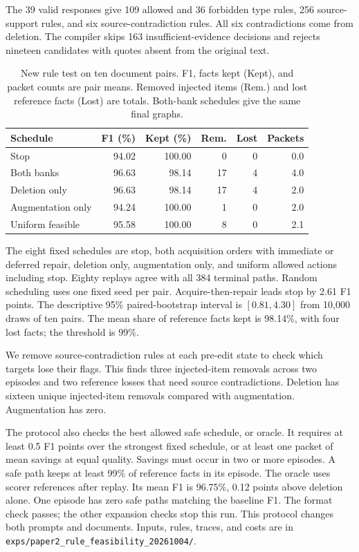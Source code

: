 The 39 valid responses give 109 allowed and 36 forbidden type rules,
256 source-support rules, and six source-contradiction rules.
All six contradictions come from deletion. The compiler skips 163
insufficient-evidence decisions and rejects nineteen candidates with
quotes absent from the original text.

\begin{table}[t]
\centering
\caption{New rule test on ten document pairs. F1, facts kept (Kept), and packet counts are pair means. Removed injected items (Rem.) and lost reference facts (Lost) are totals. Both-bank schedules give the same final graphs.}
\label{tab:new_rule_feasibility}
\small
\setlength{\tabcolsep}{3pt}
\begin{tabular}{lrrrrr}
\toprule
Schedule & F1 (\%) & Kept (\%) & Rem. & Lost & Packets \\
\midrule
Stop & 94.02 & 100.00 & 0 & 0 & 0.0 \\
Both banks & 96.63 & 98.14 & 17 & 4 & 4.0 \\
Deletion only & 96.63 & 98.14 & 17 & 4 & 2.0 \\
Augmentation only & 94.24 & 100.00 & 1 & 0 & 2.0 \\
Uniform feasible & 95.58 & 100.00 & 8 & 0 & 2.1 \\
\bottomrule
\end{tabular}
\end{table}

The eight fixed schedules are stop, both acquisition orders with immediate
or deferred repair, deletion only, augmentation only, and uniform allowed
actions including stop. Eighty replays agree with all 384 terminal paths.
Random scheduling uses one fixed seed per pair.
Acquire-then-repair leads stop by 2.61 F1 points. The descriptive 95\%
paired-bootstrap interval is $[0.81,4.30]$ from 10,000 draws of ten pairs.
The mean share of reference facts kept is 98.14\%, with four lost facts; the threshold is 99\%.

We remove source-contradiction rules at each pre-edit state to check which
targets lose their flags. This finds three injected-item removals across
two episodes and two reference losses that need source contradictions.
Deletion has sixteen unique injected-item removals compared with
augmentation. Augmentation has zero.

The protocol also checks the best allowed safe schedule, or oracle.
It requires at least 0.5 F1 points over the strongest fixed schedule,
or at least one packet of mean savings at equal quality.
Savings must occur in two or more episodes. A safe path keeps at least
99\% of reference facts in its episode. The oracle uses scorer references
after replay. Its mean F1 is 96.75\%, 0.12 points above deletion alone.
One episode has zero safe paths matching the baseline F1.
The format check passes; the other expansion checks stop this run.
This protocol changes both prompts and documents. Inputs, rules,
traces, and costs are in
\texttt{exps/paper2\_rule\_feasibility\_20261004/}.

